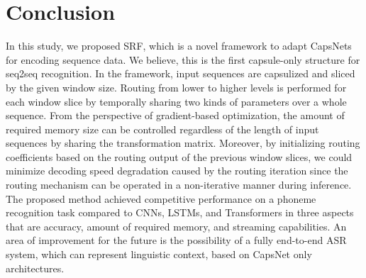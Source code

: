 \documentclass[review]{elsarticle}
\begin{document}
\section{Conclusion}
In this study, we proposed SRF, which is a novel framework to adapt CapsNets for encoding sequence data.
We believe, this is the first capsule-only structure for seq2seq recognition.
In the framework, input sequences are capsulized and sliced by the given window size.
Routing from lower to higher levels is performed for each window slice by temporally sharing two kinds of parameters over a whole sequence.
From the perspective of gradient-based optimization, the amount of required memory size can be controlled regardless of the length of input sequences by sharing the transformation matrix.
Moreover, by initializing routing coefficients based on the routing output of the previous window slices, we could minimize decoding speed degradation caused by the routing iteration since the routing mechanism can be operated in a non-iterative manner during inference.
The proposed method achieved competitive performance on a phoneme recognition task compared to CNNs, LSTMs, and Transformers in three aspects that are accuracy, amount of required memory, and streaming capabilities.
An area of improvement for the future is the possibility of a fully end-to-end ASR system, which can represent linguistic context, based on CapsNet only architectures.


\end{document}
